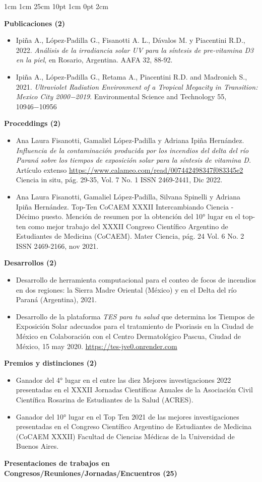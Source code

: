 \documentclass[12pt,letterpaper]{article}
\begin{document}
\setmargins{2cm}
{1cm}
{1cm}
{25cm}
{10pt}
{1cm}
{0pt}
{2cm}

\textbf{Publicaciones (2)}
\begin{itemize}[label={}]
    \item Ipiña A., López-Padilla G., Fisanotti A. L., Dávalos M. y Piacentini R.D., 2022. \textit{Análisis de la irradiancia solar UV para la síntesis de pre-vitamina D3 en la piel}, en Rosario, Argentina. AAFA 32, 88-92.
    \item Ipiña A., López-Padilla G., Retama A., Piacentini R.D. and Madronich S., 2021. \textit{Ultraviolet Radiation Environment of a Tropical Megacity in Transition: Mexico City 2000−2019}. Environmental Science and Technology 55, 10946−10956
\end{itemize}
\textbf{Proceddings (2)}
\begin{itemize}[label={}]
    \item Ana Laura Fisanotti, Gamaliel López-Padilla y Adriana Ipiña Hernández. \textit{Influencia de la contaminación producida por los incendios del delta del río Paraná sobre los tiempos de exposición solar para la síntesis de vitamina D.} Artículo extenso \url{https://www.calameo.com/read/007442498347f083345e2} Ciencia in situ, pág. 29-35, Vol. 7 No. 1 ISSN 2469-2441, Dic 2022.
    \item Ana Laura Fisanotti, Gamaliel López-Padilla, Silvana Spinelli y Adriana Ipiña Hernández. Top-Ten CoCAEM XXXII Intercambiando Ciencia - Décimo puesto. Mención de resumen por la obtención del 10° lugar en el top-ten como mejor trabajo del XXXII Congreso Científico Argentino de Estudiantes de Medicina (CoCAEM). Mater Ciencia, pág. 24 Vol. 6 No. 2 ISSN 2469-2166, nov 2021.
\end{itemize}
\textbf{Desarrollos (2)}
\begin{itemize}[label={}]
    \item Desarrollo de herramienta computacional para el conteo de focos de incendios en dos regiones: la Sierra  Madre Oriental (México) y en el Delta del río Paraná (Argentina), 2021.
    \item Desarrollo de la plataforma \textit{TES para tu salud}  que determina los Tiempos de Exposición Solar adecuados para el tratamiento de Psoriasis en la Ciudad de México en Colaboración con el Centro Dermatológico Pascua, Ciudad de México, 15 may 2020. \url{https://tes-jve0.onrender.com}
\end{itemize}
\textbf{Premios y distinciones (2)}
\begin{itemize}[label={}]
    \item  Ganador del 4° lugar en el  entre las diez Mejores investigaciones 2022 presentadas en el XXXII Jornadas Científicas Anuales de la Asociación Civil Científica Rosarina de Estudiantes de la Salud (ACRES).
    \item Ganador del 10° lugar en el Top Ten 2021 de las mejores investigaciones presentadas en el Congreso Científico Argentino de Estudiantes de Medicina (CoCAEM XXXII) Facultad de Ciencias Médicas de la Universidad de Buenos Aires.
\end{itemize}
\textbf{Presentaciones de trabajos en Congresos/Reuniones/Jornadas/Encuentros (25)}
\end{document}
